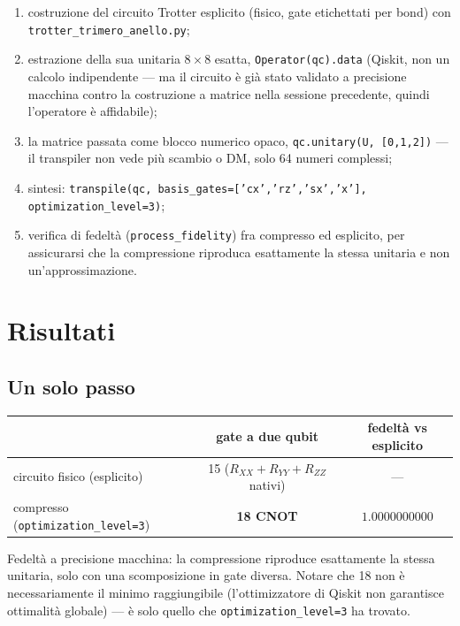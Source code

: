 \documentclass[11pt,a4paper]{article}
\begin{document}
\begin{enumerate}[leftmargin=1.4em,itemsep=0.25em]
\item costruzione del circuito Trotter esplicito (fisico, gate
etichettati per bond) con \texttt{trotter\_trimero\_anello.py};
\item estrazione della sua unitaria $8\times8$ esatta,
\texttt{Operator(qc).data} (Qiskit, non un calcolo indipendente --- ma il
circuito è già stato validato a precisione macchina contro la costruzione
a matrice nella sessione precedente, quindi l'operatore è affidabile);
\item la matrice passata come blocco numerico opaco,
\texttt{qc.unitary(U, [0,1,2])} --- il transpiler non vede più scambio o
DM, solo 64 numeri complessi;
\item sintesi: \texttt{transpile(qc, basis\_gates=['cx','rz','sx','x'],
optimization\_level=3)};
\item verifica di fedeltà (\texttt{process\_fidelity}) fra compresso ed
esplicito, per assicurarsi che la compressione riproduca esattamente la
stessa unitaria e non un'approssimazione.
\end{enumerate}

\section{Risultati}

\subsection*{Un solo passo}

\begin{center}
\renewcommand{\arraystretch}{1.3}
\begin{tabular}{lcc}
\toprule
& gate a due qubit & fedeltà vs esplicito \\
\midrule
circuito fisico (esplicito) & 15 ($R_{XX}{+}R_{YY}{+}R_{ZZ}$ nativi) & --- \\
compresso (\texttt{optimization\_level=3}) & \textbf{18 CNOT} & $1.0000000000$ \\
\bottomrule
\end{tabular}
\end{center}

Fedeltà a precisione macchina: la compressione riproduce esattamente la
stessa unitaria, solo con una scomposizione in gate diversa. Notare che 18
non è necessariamente il minimo raggiungibile (l'ottimizzatore di Qiskit
non garantisce ottimalità globale) --- è solo quello che
\texttt{optimization\_level=3} ha trovato.
\end{document}

